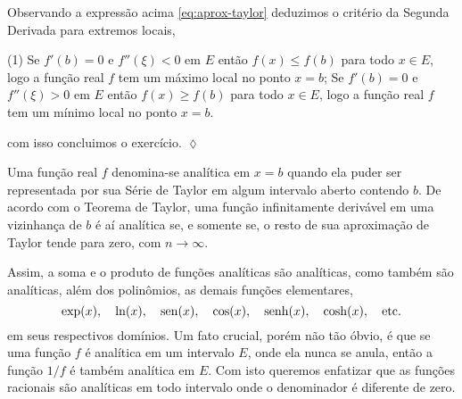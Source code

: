 Observando a expressão acima \eqref{eq:aprox-taylor} deduzimos o critério da Segunda 
Derivada para extremos locais,
\begin{tasks}[label=(\alph*),item-indent=3.0em,label-width=4ex,ref=(\alph*)](1)
\task Se \(f'(b)=0\) e \(f''(\xi)<0\) em \(E\) então \(f(x)\leq f(b)\) para todo \(x\in E\), logo a função 
real \(f\) tem um máximo local no ponto \(x=b\);
\task Se \(f'(b)=0\) e \(f''(\xi) >0 \) em \(E\) então \(f(x)\geq f(b)\) para todo \(x\in E\), logo a função 
real \(f\) tem um mínimo local no ponto \(x=b\).
\end{tasks}
com isso concluimos o exercício. \hfill \(\lozenge\)

Uma função real \(f\) denomina-se analítica em \(x=b\) quando ela puder ser representada
por sua Série de Taylor em algum intervalo aberto contendo \(b\). De acordo com o Teorema de
Taylor, uma função infinitamente derivável em uma vizinhança de \(b\) é aí analítica se, e
somente se, o resto de sua aproximação de Taylor tende para zero, com \(n \to \infty\).

Assim, a soma e o produto de funções analíticas são analíticas, como também são analíticas, além dos
polinômios, as demais funções elementares, 
\begin{equation*}
\exp(x),\quad  \ln(x),\quad  \operatorname{sen}(x),\quad  \cos(x), \quad \operatorname{senh}(x), \quad \cosh(x),\quad \text{etc.}
\end{equation*} 
em seus respectivos domínios. Um fato crucial, porém não tão óbvio, é que se uma função \(f\) é
analítica em um intervalo \(E\), onde ela nunca se anula, então a função \(1/f\) é também analítica em
\(E\). Com isto queremos enfatizar que as funções racionais são analíticas em todo intervalo onde
o denominador é diferente de zero.


